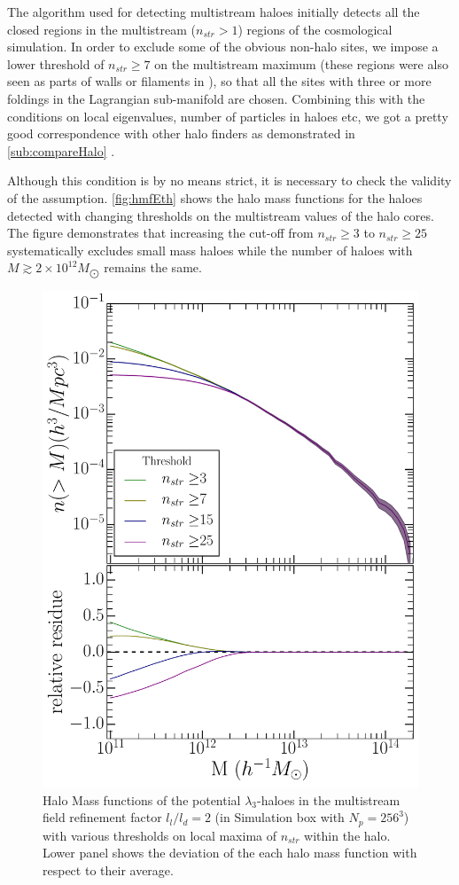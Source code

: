 \documentclass[fleqn,usenatbib,useAMS]{mnras}
\begin{document}
{The algorithm used for detecting multistream haloes initially detects all the closed regions in the multistream ($n_{str} > 1$) regions of the cosmological simulation. In order to exclude some of the obvious non-halo sites, we impose a lower threshold of $n_{str} \geq 7$ on the multistream maximum (these regions were also seen as parts of walls or filaments in \citealt{Ramachandra2015} ), so that all the sites with three or more foldings in the Lagrangian sub-manifold are chosen. Combining this with the conditions on local eigenvalues, number of particles in haloes etc, we got a pretty good correspondence with other halo finders as demonstrated in \autoref{sub:compareHalo} . 

Although this condition is by no means strict, it is necessary to check the validity of the assumption. \autoref{fig:hmfEth} shows the halo mass functions for the haloes detected with changing thresholds on the multistream values of the halo cores. The figure demonstrates that increasing the cut-off from $n_{str} \geq 3$ to $n_{str} \geq 25$ systematically excludes small mass
haloes while the number of haloes with $M  \gtrsim 2\times10^{12} M_{\bigodot}$  remains the same.}
 


\begin{figure}
\begin{minipage}[t]{.99\linewidth}
 \centering\includegraphics[width=8.cm]{fig7.pdf} 
\end{minipage}\hfill
\caption{Halo Mass functions of the potential $\lambda_3$-haloes in the multistream field refinement factor $l_l/l_d = 2$ (in Simulation box with $N_p = 256^3$) with various thresholds on local maxima of $n_{str}$ within the halo. Lower panel shows the deviation of the each halo mass function with respect to their average.}
\label{fig:hmfEth}
\end{figure}
\end{document}
